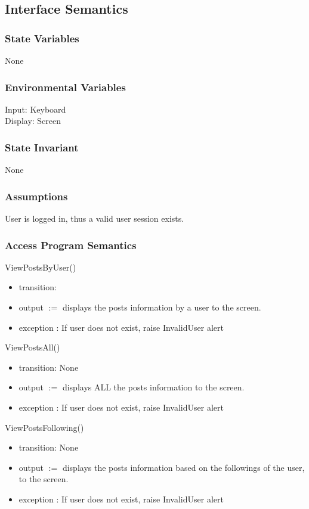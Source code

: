\documentclass[12pt, titlepage]{article}
\begin{document}
\subsection{Interface Semantics}
\subsubsection{State Variables}
None

\subsubsection{Environmental Variables}
Input: Keyboard\\
Display: Screen

\subsubsection{State Invariant}
None

\subsubsection{Assumptions}
User is logged in, thus a valid user session exists.

\subsubsection{Access Program Semantics}
ViewPostsByUser()
\begin{itemize}
    \item transition: 
    \item output $:= $ displays the posts information by a user to the screen.
    \item exception : If user does not exist, raise InvalidUser alert
\end{itemize}

ViewPostsAll()
\begin{itemize}
    \item transition: None
    \item output $:= $ displays ALL the posts information to the screen.
    \item exception : If user does not exist, raise InvalidUser alert
\end{itemize}

ViewPostsFollowing()
\begin{itemize}
    \item transition: None
    \item output $:= $ displays the posts information based on the followings of the user, to the screen.
    \item exception : If user does not exist, raise InvalidUser alert
\end{itemize}
\end{document}
